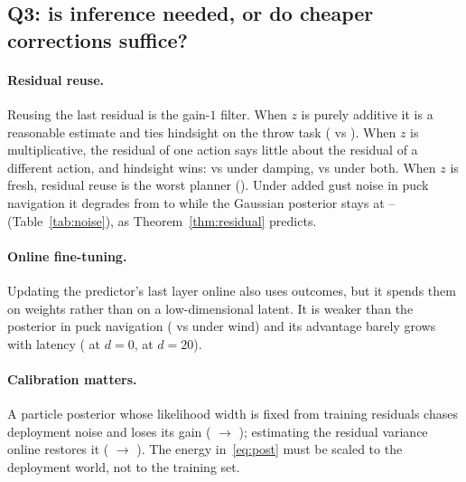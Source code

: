 \documentclass[11pt]{article}
\begin{document}
\subsection{Q3: is inference needed, or do cheaper corrections suffice?}

\paragraph{Residual reuse.} Reusing the last residual is the gain-$1$ filter. When $z$ is purely additive it is a
reasonable estimate and ties hindsight on the throw task (\twResidWind{} vs \twHindWind). When $z$ is multiplicative,
the residual of one action says little about the residual of a different action, and hindsight wins: \twHindDamp{} vs
\twResidDamp{} under damping, \twHindBoth{} vs \twResidBoth{} under both. When $z$ is fresh, residual reuse is the worst
planner (\twResidFresh). Under added gust noise in puck navigation it degrades from \nzResidZero{} to \nzResidOne{}
while the Gaussian posterior stays at \nzPostZero{}--\nzPostOne{} (Table~\ref{tab:noise}), as Theorem~\ref{thm:residual}
predicts.

\paragraph{Online fine-tuning.} Updating the predictor's last layer online also uses outcomes, but it spends them on
weights rather than on a low-dimensional latent. It is weaker than the posterior in puck navigation (\mjSgdWind{} vs
\mjPostWind{} under wind) and its advantage barely grows with latency (\dlSgdZero{} at $d=0$, \dlSgdTwenty{} at $d=20$).

\paragraph{Calibration matters.} A particle posterior whose likelihood width is fixed from training residuals chases
deployment noise and loses its gain (\nzFixedZero{} $\to$ \nzFixedOne); estimating the residual variance online restores
it (\nzAdaptZero{} $\to$ \nzAdaptOne). The energy in~\eqref{eq:post} must be scaled to the deployment world, not to
the training set.

\begin{table}[t]\centering\scriptsize

\caption{Puck navigation under persistent wind plus i.i.d.\ gusts: cost relative to forward planning.}
\label{tab:noise}
\end{table}
\end{document}
